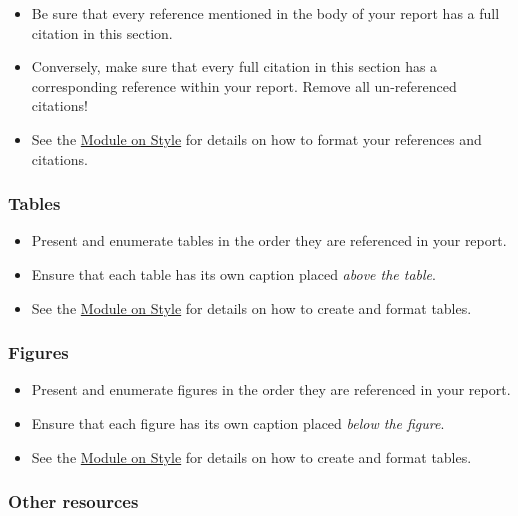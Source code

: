 \documentclass[
]{book}
\begin{document}
\begin{itemize}
\item
  Be sure that every reference mentioned in the body of your report has a full citation in this section.
\item
  Conversely, make sure that every full citation in this section has a corresponding reference within your report. Remove all un-referenced citations!
\item
  See the \protect\hyperlink{style}{Module on Style} for details on how to format your references and citations.
\end{itemize}

\hypertarget{tables-1}{%
\subsubsection*{Tables}\label{tables-1}}

\begin{itemize}
\item
  Present and enumerate tables in the order they are referenced in your report.
\item
  Ensure that each table has its own caption placed \emph{above the table}.
\item
  See the \protect\hyperlink{style}{Module on Style} for details on how to create and format tables.
\end{itemize}

\hypertarget{figures-1}{%
\subsubsection*{Figures}\label{figures-1}}

\begin{itemize}
\item
  Present and enumerate figures in the order they are referenced in your report.
\item
  Ensure that each figure has its own caption placed \emph{below the figure}.
\item
  See the \protect\hyperlink{style}{Module on Style} for details on how to create and format tables.
\end{itemize}

\hypertarget{other-resources-4}{%
\subsubsection*{Other resources}\label{other-resources-4}}
\end{document}
